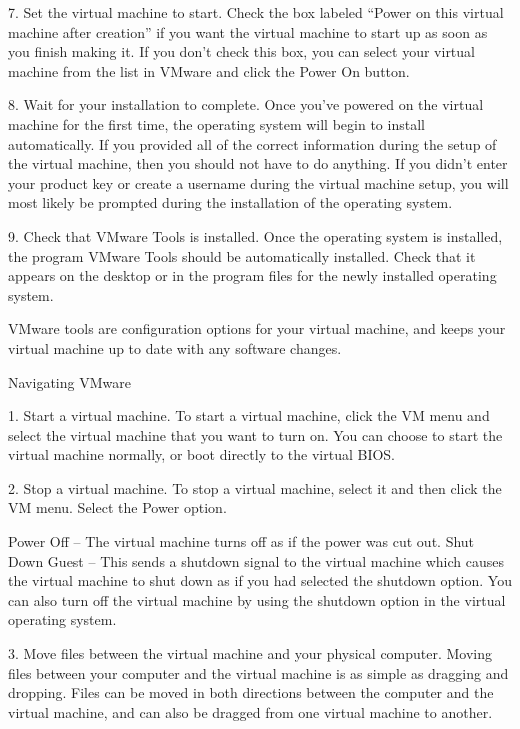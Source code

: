 7. Set the virtual machine to start. Check the box labeled “Power on this virtual machine after creation” if you want the virtual machine to start up as soon as you finish making it. If you don’t check this box, you can select your virtual machine from the list in VMware and click the Power On button.



8. Wait for your installation to complete. Once you’ve powered on the virtual machine for the first time, the operating system will begin to install automatically. If you provided all of the correct information during the setup of the virtual machine, then you should not have to do anything. If you didn’t enter your product key or create a username during the virtual machine setup, you will most likely be prompted during the installation of the operating system.



9. Check that VMware Tools is installed. Once the operating system is installed, the program VMware Tools should be automatically installed. Check that it appears on the desktop or in the program files for the newly installed operating system.

VMware tools are configuration options for your virtual machine, and keeps your virtual machine up to date with any software changes.

Navigating VMware


1. Start a virtual machine. To start a virtual machine, click the VM menu and select the virtual machine that you want to turn on. You can choose to start the virtual machine normally, or boot directly to the virtual BIOS.



2. Stop a virtual machine. To stop a virtual machine, select it and then click the VM menu. Select the Power option.

Power Off – The virtual machine turns off as if the power was cut out.
Shut Down Guest – This sends a shutdown signal to the virtual machine which causes the virtual machine to shut down as if you had selected the shutdown option.
You can also turn off the virtual machine by using the shutdown option in the virtual operating system.


3. Move files between the virtual machine and your physical computer. Moving files between your computer and the virtual machine is as simple as dragging and dropping. Files can be moved in both directions between the computer and the virtual machine, and can also be dragged from one virtual machine to another.


